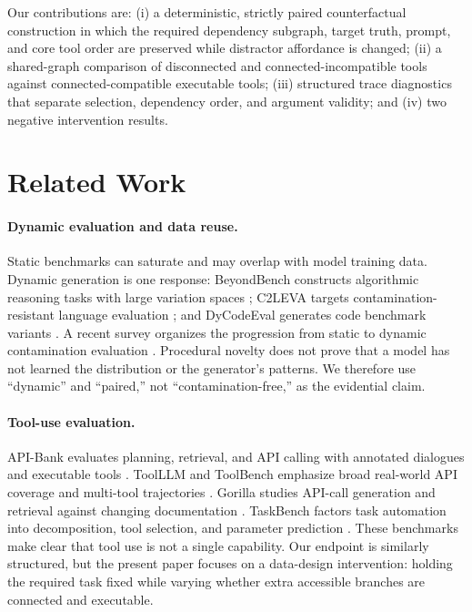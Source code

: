 \documentclass[twoside,11pt,preprint]{article}
\begin{document}
Our contributions are: (i) a deterministic, strictly paired counterfactual
construction in which the required dependency subgraph, target truth, prompt,
and core tool order are preserved while distractor affordance is changed; (ii) a
shared-graph comparison of disconnected and connected-incompatible tools against
connected-compatible executable tools; (iii) structured trace diagnostics that
separate selection, dependency order, and argument validity; and (iv) two
negative intervention results.

\section{Related Work}

\paragraph{Dynamic evaluation and data reuse.}
Static benchmarks can saturate and may overlap with model training data. Dynamic
generation is one response: BeyondBench constructs algorithmic reasoning tasks
with large variation spaces \citep{srivastava2025beyondbench}; C2LEVA targets
contamination-resistant language evaluation \citep{li2025c2leva}; and DyCodeEval
generates code benchmark variants \citep{chen2025dycodeeval}. A recent survey
organizes the progression from static to dynamic contamination evaluation
\citep{chen2025contamination}. Procedural novelty does not prove that a model has
not learned the distribution or the generator's patterns. We therefore use
``dynamic'' and ``paired,'' not ``contamination-free,'' as the evidential claim.

\paragraph{Tool-use evaluation.}
API-Bank evaluates planning, retrieval, and API calling with annotated dialogues
and executable tools \citep{li2023apibank}. ToolLLM and ToolBench emphasize
broad real-world API coverage and multi-tool trajectories
\citep{qin2023toolllm}. Gorilla studies API-call generation and retrieval against
changing documentation \citep{patil2023gorilla}. TaskBench factors task
automation into decomposition, tool selection, and parameter prediction
\citep{shen2024taskbench}. These benchmarks make clear that tool use is not a
single capability. Our endpoint is similarly structured, but the present paper
focuses on a data-design intervention: holding the required task fixed while
varying whether extra accessible branches are connected and executable.
\end{document}
